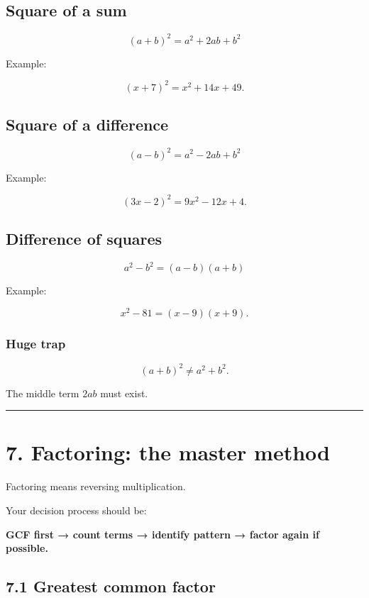 \documentclass[
]{article}
\begin{document}
\subsection{Square of a sum}\label{square-of-a-sum}

\[
\boxed{(a+b)^2=a^2+2ab+b^2}
\]

Example:

\[
(x+7)^2=x^2+14x+49.
\]

\subsection{Square of a difference}\label{square-of-a-difference}

\[
\boxed{(a-b)^2=a^2-2ab+b^2}
\]

Example:

\[
(3x-2)^2
=
9x^2-12x+4.
\]

\subsection{Difference of squares}\label{difference-of-squares}

\[
\boxed{a^2-b^2=(a-b)(a+b)}
\]

Example:

\[
x^2-81=(x-9)(x+9).
\]

\subsubsection{Huge trap}\label{huge-trap}

\[
(a+b)^2 \neq a^2+b^2.
\]

The middle term \(2ab\) must exist.

\begin{center}\rule{0.5\linewidth}{0.5pt}\end{center}

\section{7. Factoring: the master
method}\label{factoring-the-master-method}

Factoring means reversing multiplication.

Your decision process should be:

\textbf{GCF first → count terms → identify pattern → factor again if
possible.}

\subsection{7.1 Greatest common factor}\label{greatest-common-factor}
\end{document}
